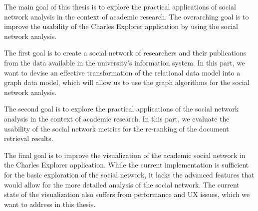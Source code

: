 The main goal of this thesis is to explore the practical applications of social network analysis 
in the context of academic research. The overarching goal is to improve the usability
of the Charles Explorer application by using the social network analysis.

The first goal is to create a social network of researchers and their publications from the data available in the university's information system.
In this part, we want to devise an effective transformation of the relational data model into a graph data model, 
which will allow us to use the graph algorithms for the social network analysis.

The second goal is to explore the practical applications of the social network analysis in the context of academic research.
In this part, we evaluate the usability of the social network metrics for the re-ranking of the document retrieval results.

The final goal is to improve the visualization of the academic social network in the Charles Explorer application.
While the current implementation is sufficient for the basic exploration of the social network, 
it lacks the advanced features that would allow for the more detailed analysis of the social network.
The current state of the visualization also suffers from performance and UX issues, which we want to address in this thesis.

